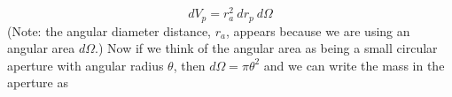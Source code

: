 \begin{equation}
  dV_p = r_a^2\ dr_p\ d\Omega
\end{equation}
(Note: the angular diameter distance, $r_a$, appears because we are using an angular area $d\Omega$.)  Now if we think of the angular area as being a small circular aperture with angular radius $\theta$, then $d\Omega = \pi\theta^2$ and we can write the mass in the aperture as